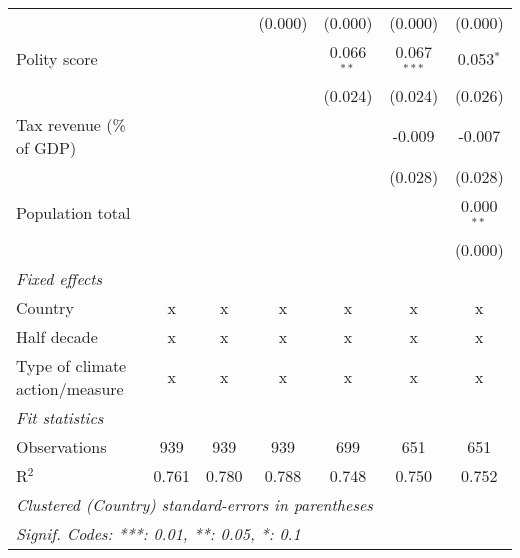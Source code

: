 \begin{tabular}{lcccccc}
                                                                             &         &                & (0.000)        & (0.000)        & (0.000)        & (0.000)\\   
   Polity score                                                              &         &                &                & 0.066$^{**}$   & 0.067$^{***}$  & 0.053$^{*}$\\   
                                                                             &         &                &                & (0.024)        & (0.024)        & (0.026)\\   
   Tax revenue (\% of GDP)                                                   &         &                &                &                & -0.009         & -0.007\\   
                                                                             &         &                &                &                & (0.028)        & (0.028)\\   
   Population total                                                          &         &                &                &                &                & 0.000$^{**}$\\   
                                                                             &         &                &                &                &                & (0.000)\\   
   \emph{Fixed effects}\\
   Country                                                                   & x       & x              & x              & x              & x              & x\\  
   Half decade                                                               & x       & x              & x              & x              & x              & x\\  
   Type of climate action/measure                                            & x       & x              & x              & x              & x              & x\\  
   \midrule \emph{Fit statistics}\\
   Observations                                                              & 939     & 939            & 939            & 699            & 651            & 651\\  
   R$^2$                                                                     & 0.761   & 0.780          & 0.788          & 0.748          & 0.750          & 0.752\\  
   \midrule
   \multicolumn{7}{l}{\emph{Clustered (Country) standard-errors in parentheses}}\\
   \multicolumn{7}{l}{\emph{Signif. Codes: ***: 0.01, **: 0.05, *: 0.1}}\\
\end{tabular}
\par\endgroup


